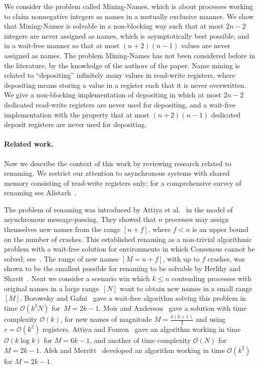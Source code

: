 \documentclass[11pt]{article}
\newcommand{\BBB}{\vspace*{-\bigskipamount}}
\newcommand{\cO}{\mathcal{O}}
\newcommand{\Paragraph}[1]{\BBB\paragraph{#1}}
\begin{document}
We consider the problem called Mining-Names, which is about processes working to claim nonnegative integers  as names in a mutually exclusive manner.
We show that Mining-Names is solvable in a non-blocking way such that at most $2n-2$ integers are never assigned as names, which is asymptotically best possible, and in a wait-free manner so that at most $(n+2)(n-1)$ values are never assigned as names.
The problem Mining-Names  has not been considered  before in the literature, by the knowledge of the authors of the paper.
Name mining  is related to ``depositing'' infinitely many values in read-write registers, where depositing means storing a value in a register such that it is never overwritten.
We give a non-blocking implementation of depositing in which at most $2n-2$ dedicated read-write registers are never used for depositing, and a wait-free implementation with the property that at most $(n+2)(n-1)$ dedicated deposit registers are never used for depositing.




\Paragraph{Related work.}



Now we describe the context of this work by reviewing research related to renaming.
We restrict our attention to asynchronous systems with shared memory consisting of read-write registers only; for a comprehensive survey of renaming see Alistarh~\cite{Alistarh15}.

The problem of renaming was introduced by Attiya et al.~\cite{AttiyaBDPR90} in the model of asynchronous message-passing. 
They showed that $n$ processes may assign themselves new names from the range $[n+f]$, where $f<n$ is an upper bound on the number of crashes.
This established renaming as a non-trivial algorithmic problem with a wait-free solution for  environments in which Consensus cannot be solved; see~\cite{Attiya-Welch-book2004,HerlihyKozlovRajsbaum-book,Lynch-book96}.
The range of new names $[M=n+f]$, with up to $f$ crashes, was shown to be the smallest possible for renaming to be solvable by Herlihy and Shavit~\cite{HerlihyS99}.
Next we consider a scenario win which $k\leq n$ contending processes with original names in a large range~$[N]$ want to obtain new names in a small range~$[M]$.
Borowsky and Gafni~\cite{BorowskyG92} gave a wait-free algorithm solving this problem in  time $\cO(k^2N)$ for~$M=2k-1$.
Moir and Anderson~\cite{MoirA95} gave a solution with time complexity $\cO(k)$, for new names of magnitude $M=\frac{k(k+1)}{2}$ and using $r=\cO(k^2)$ registers. 
Attiya and Fouren~\cite{AttiyaF01} gave an algorithm working in time $\cO(k\log k)$ for $M=6k-1$, and another of time complexity $\cO(N)$ for $M=2k-1$. 
Afek and Merritt~\cite{AfekM99} developed an algorithm working in time $\cO(k^2)$ for $M=2k-1$.
\end{document}
